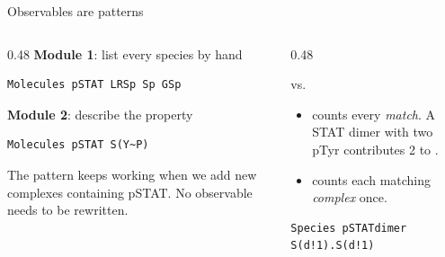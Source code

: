 \documentclass[aspectratio=169,10pt,t]{beamer}
\begin{document}
\begin{frame}[fragile]{Observables are patterns}
  \begin{columns}[T]
    \begin{column}{0.48\textwidth}
      \textbf{Module 1}: list every species by hand
\begin{lstlisting}[language=bngl]
Molecules pSTAT LRSp Sp GSp
\end{lstlisting}
      \vskip2mm
      \textbf{Module 2}: describe the property
\begin{lstlisting}[language=bngl]
Molecules pSTAT S(Y~P)
\end{lstlisting}
      \small
      The pattern keeps working when we add new complexes containing pSTAT.
      No observable needs to be rewritten.
    \end{column}
    \begin{column}{0.48\textwidth}
      \begin{block}{ vs.\ }
        \small
        \begin{itemize}
          \item {} counts every \emph{match}. A STAT dimer with two
                pTyr contributes 2 to .
          \item {} counts each matching \emph{complex} once.
        \end{itemize}
\begin{lstlisting}[language=bngl]
Species pSTATdimer S(d!1).S(d!1)
\end{lstlisting}
      \end{block}
    \end{column}
  \end{columns}
\end{frame}
\end{document}
